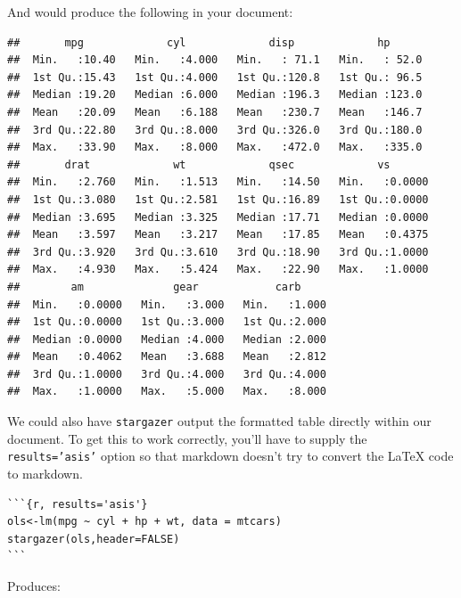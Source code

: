 \documentclass[12pt, oneside]{amsart}   	%
\begin{document}
\newpage

And would produce the following in your document:

\begin{verbatim}
##       mpg             cyl             disp             hp       
##  Min.   :10.40   Min.   :4.000   Min.   : 71.1   Min.   : 52.0  
##  1st Qu.:15.43   1st Qu.:4.000   1st Qu.:120.8   1st Qu.: 96.5  
##  Median :19.20   Median :6.000   Median :196.3   Median :123.0  
##  Mean   :20.09   Mean   :6.188   Mean   :230.7   Mean   :146.7  
##  3rd Qu.:22.80   3rd Qu.:8.000   3rd Qu.:326.0   3rd Qu.:180.0  
##  Max.   :33.90   Max.   :8.000   Max.   :472.0   Max.   :335.0  
##       drat             wt             qsec             vs        
##  Min.   :2.760   Min.   :1.513   Min.   :14.50   Min.   :0.0000  
##  1st Qu.:3.080   1st Qu.:2.581   1st Qu.:16.89   1st Qu.:0.0000  
##  Median :3.695   Median :3.325   Median :17.71   Median :0.0000  
##  Mean   :3.597   Mean   :3.217   Mean   :17.85   Mean   :0.4375  
##  3rd Qu.:3.920   3rd Qu.:3.610   3rd Qu.:18.90   3rd Qu.:1.0000  
##  Max.   :4.930   Max.   :5.424   Max.   :22.90   Max.   :1.0000  
##        am              gear            carb      
##  Min.   :0.0000   Min.   :3.000   Min.   :1.000  
##  1st Qu.:0.0000   1st Qu.:3.000   1st Qu.:2.000  
##  Median :0.0000   Median :4.000   Median :2.000  
##  Mean   :0.4062   Mean   :3.688   Mean   :2.812  
##  3rd Qu.:1.0000   3rd Qu.:4.000   3rd Qu.:4.000  
##  Max.   :1.0000   Max.   :5.000   Max.   :8.000
\end{verbatim}

We could also have \texttt{stargazer} output the formatted table directly within our document. To get this to work correctly, you'll have to supply the \texttt{results='asis'} option so that markdown doesn't try to convert the LaTeX code to markdown.

\begin{verbatim}
```{r, results='asis'}
ols<-lm(mpg ~ cyl + hp + wt, data = mtcars)
stargazer(ols,header=FALSE)
```
\end{verbatim}

\newpage

Produces:
\end{document}
